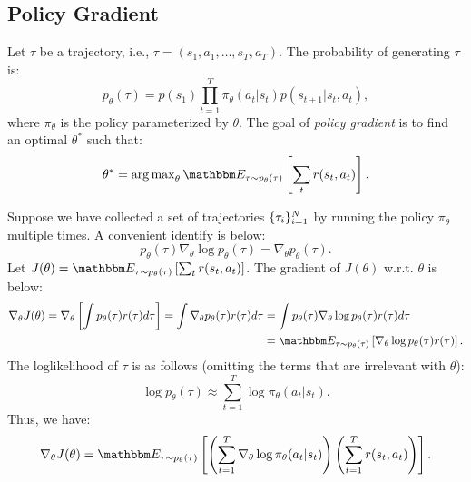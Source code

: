 


    
\subsection{Policy Gradient}
Let $\tau$ be a trajectory, i.e., $\tau = (s_1, a_1, \ldots, s_T, a_T)$.
The probability of generating $\tau$ is:
    \begin{equation}
        p_{\theta}(\tau) = p(s_1) \prod_{t=1}^{T}{\pi_{\theta}(a_t | s_t) p(s_{t+1} | s_t, a_t)},
    \end{equation}
where $\pi_{\theta}$ is the policy parameterized by $\theta$.
The goal of \emph{policy gradient} is to find an optimal $\theta^\ast$ such that:
    \begin{equation}
        \theta^\ast = \argmax_{\theta} \E_{\tau \sim p_\theta(\tau)}\left[ \sum_{t}^{}{r(s_t, a_t)} \right].
    \end{equation}
    
Suppose we have collected a set of trajectories $\{ \tau_i \}_{i=1}^{N}$ by running the policy $\pi_{\theta}$ multiple times.
A convenient identify is below:
    \begin{equation}
        p_{\theta}(\tau)\nabla_{\theta}\log p_{\theta}(\tau) = \nabla_\theta p_\theta(\tau).
    \end{equation}
Let $J(\theta) = \E_{\tau \sim p_\theta(\tau)}\left[ \sum_{t}^{}{r(s_t, a_t)} \right]$.
The gradient of $J(\theta)$ w.r.t. $\theta$ is below:
    \begin{equation}
        \begin{aligned}
        \nabla_\theta J(\theta) = \nabla_\theta \left[ \int p_\theta(\tau) r(\tau) d\tau \right] = \int \nabla_\theta p_\theta(\tau) r(\tau) d\tau  & = \int p_{\theta}(\tau)\nabla_{\theta}\log p_{\theta}(\tau)  r(\tau) d\tau \\
        & = \E_{\tau \sim p_\theta(\tau)} \left[ \nabla_\theta \log p_\theta(\tau) r(\tau) \right].
        \end{aligned}
    \end{equation}
The loglikelihood of $\tau$ is as follows (omitting the terms that are irrelevant with $\theta$):
    \begin{equation}
        \log p_\theta(\tau) \approx \sum_{t=1}^{T}{\log \pi_{\theta}(a_t | s_t)}.
    \end{equation}
Thus, we have:
    \begin{equation}
        \nabla_\theta J(\theta) = \E_{\tau \sim p_\theta(\tau)}\left[ \left( \sum_{t=1}^{T}{\nabla_\theta \log\pi_{\theta}(a_t | s_t)}\right) \left( \sum_{t=1}^{T}{r(s_t, a_t)} \right)\right].
    \end{equation}
    
